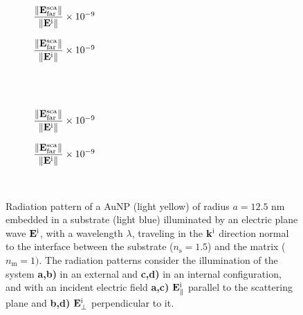 \begin{figure}[b!]
    \centering
    \def\svgwidth{.8\textwidth}
    \hspace*{-.215\textwidth}%
    \vspace*{-.5em}%
        \begin{subfigure}{.32\textwidth}\caption{\footnotesize$\dfrac{\norm{\vb{E}^\text{sca}_\text{far}}}{\norm{\vb{E}^\text{i}}} \times 10^{-9}$  }\label{sfig:Far:Emb:Norm:a}\end{subfigure}%
        \begin{subfigure}{.4\textwidth}\caption{\footnotesize$\dfrac{\norm{\vb{E}^\text{sca}_\text{far}}}{\norm{\vb{E}^\text{i}}} \times 10^{-9}$  }\label{sfig:Far:Emb:Norm:b}\end{subfigure}\\
    \\
    \def\svgwidth{.8\textwidth}
    \hspace*{-.215\textwidth}%
    \vspace*{-.5em}%
        \begin{subfigure}{.32\textwidth}\caption{\footnotesize$\dfrac{\norm{\vb{E}^\text{sca}_\text{far}}}{\norm{\vb{E}^\text{i}}} \times 10^{-9}$  }\label{sfig:Far:Emb:Norm:c}\end{subfigure}%
        \begin{subfigure}{.4\textwidth}\caption{\footnotesize$\dfrac{\norm{\vb{E}^\text{sca}_\text{far}}}{\norm{\vb{E}^\text{i}}} \times 10^{-9}$  }\label{sfig:Far:Emb:Norm:d}\end{subfigure}\\
    \caption[ Radiation pattern of a AuNP totally embedded in a substrate illuminated at normal incidence ]{Radiation pattern of a AuNP (light yellow) of radius $a = 12.5$ nm embedded in a substrate (light blue) illuminated by an electric plane wave $\vb{E}^\text{i}$, with a wavelength $\lambda$, traveling in the $\vb{k}^\text{i}$ direction normal to the interface between the substrate ($n_\text{s} = 1.5$) and the matrix ($n_\text{m} = 1)$. The radiation patterns consider the illumination of the system  \textbf{a,b)} in an external and  \textbf{c,d)} in an internal configuration, and with an incident electric field \textbf{a,c)}  $\vb{E}^\text{i}_\parallel$ parallel to the scattering plane and \textbf{b,d)} $\vb{E}^\text{i}_\perp$ perpendicular to it.}
    \label{fig:Far:Emb:Norm}
\end{figure}

